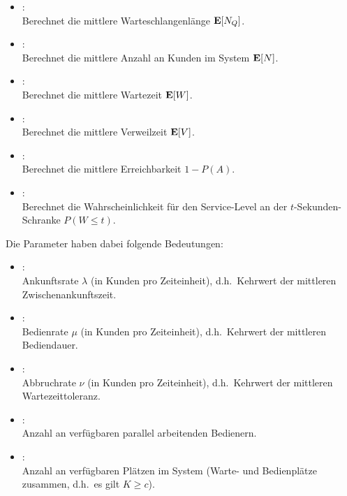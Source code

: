 \begin{itemize}

\item
{}:\\
Berechnet die mittlere Warteschlangenlänge ${\bf E}[N_Q]$. 

\item
{}:\\
Berechnet die mittlere Anzahl an Kunden im System ${\bf E}[N]$.

\item
{}:\\
Berechnet die mittlere Wartezeit ${\bf E}[W]$.

\item
{}:\\
Berechnet die mittlere Verweilzeit ${\bf E}[V]$.

\item
{}:\\
Berechnet die mittlere Erreichbarkeit $1-P(A)$.

\item
{}:\\
Berechnet die Wahrscheinlichkeit für den Service-Level an der $t$-Sekunden-Schranke $P(W\le t)$.

\end{itemize}

Die Parameter haben dabei folgende Bedeutungen:
\begin{itemize}
\item
{}:\\
Ankunftsrate $\lambda$ (in Kunden pro Zeiteinheit), d.h.\ Kehrwert der mittleren Zwischenankunftszeit.
\item
{}:\\
Bedienrate $\mu$ (in Kunden pro Zeiteinheit), d.h.\ Kehrwert der mittleren Bediendauer.
\item
{}:\\
Abbruchrate $\nu$ (in Kunden pro Zeiteinheit), d.h.\ Kehrwert der mittleren Wartezeittoleranz.
\item
{}:\\
Anzahl an verfügbaren parallel arbeitenden Bedienern.
\item
{}:\\
Anzahl an verfügbaren Plätzen im System (Warte- und Bedienplätze zusammen, d.h.\ es gilt $K\ge c$).
\end{itemize}



